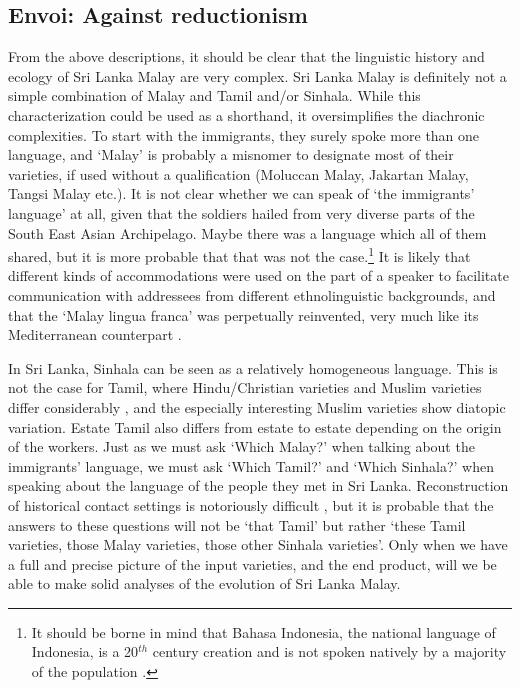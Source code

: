 \subsection{Envoi: Against reductionism}
From the above descriptions, it should be clear that the linguistic history and ecology of Sri Lanka Malay are very complex. Sri Lanka Malay is definitely not a simple combination of Malay and Tamil and/or Sinhala. While this characterization could be used as a shorthand, it oversimplifies the diachronic complexities. To start with the immigrants, they surely spoke more than one language, and `Malay' is probably a misnomer to designate most of their varieties, if used without a qualification (Moluccan Malay, Jakartan Malay, Tangsi Malay etc.). It is not clear whether we can speak of `the immigrants' language' at all, given that the soldiers hailed from very diverse parts of the South East Asian Archipelago. Maybe there was a language which all of them shared, but it is more probable that that was not the case.\footnote{It should be borne in mind that Bahasa Indonesia, the national language of Indonesia, is a 20$^{th}$ century creation and is not spoken natively by a majority of the population \citep{Steinhauer2005}.} It is likely that different kinds of accommodations  were used on the part of a speaker to facilitate communication with addressees from different ethnolinguistic backgrounds, and that the `Malay lingua franca' was perpetually reinvented, very much like its Mediterranean counterpart \citep{Selbach2007,Selbachinpreparation}.

In Sri Lanka, Sinhala can be seen as a relatively homogeneous language. This is not the case for Tamil, where Hindu/Christian varieties and Muslim varieties differ considerably \citep{Nuhman2007}, and the especially interesting Muslim varieties show diatopic variation. Estate Tamil also differs from estate to estate depending on the origin of the workers. Just as we must ask `Which Malay?' when talking about the immigrants' language, we must ask `Which Tamil?' and `Which Sinhala?' when speaking about the language of the people they met in Sri Lanka.  Reconstruction of historical contact settings is notoriously difficult \citep{RenfrewEtAl2000,Lim2007merger,Ansaldo2009clfet}, but it is probable that the answers to these questions will not be `that Tamil' but rather `these Tamil varieties, those Malay varieties, those other Sinhala varieties'. Only when we have a full and precise picture of the input varieties, and the end product, will we be able to make solid analyses of the evolution of Sri Lanka Malay.


